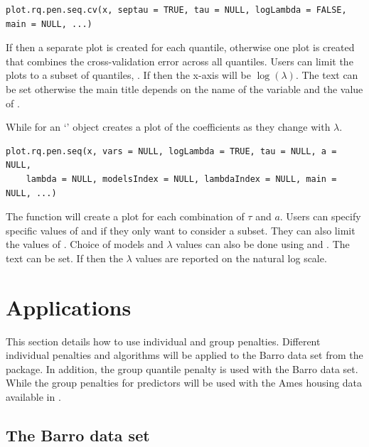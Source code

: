 \begin{verbatim}
plot.rq.pen.seq.cv(x, septau = TRUE, tau = NULL, logLambda = FALSE, main = NULL, ...)
\end{verbatim}

If  then a separate plot is created for each quantile, otherwise one plot is created that combines the cross-validation error across all quantiles. Users can limit the plots to a subset of quantiles, . If  then the x-axis will be \(\log(\lambda)\). The  text can be set otherwise the main title depends on the name of the variable and the value of .

While  for an `' object creates a plot of the coefficients as they change with \(\lambda\).

\begin{verbatim}
plot.rq.pen.seq(x, vars = NULL, logLambda = TRUE, tau = NULL, a = NULL,
    lambda = NULL, modelsIndex = NULL, lambdaIndex = NULL, main = NULL, ...)
\end{verbatim}

The  function will create a plot for each combination of \(\tau\) and \(a\). Users can specify specific values of  and  if they only want to consider a subset. They can also limit the values of . Choice of models and \(\lambda\) values can also be done using  and . The  text can be set. If  then the \(\lambda\) values are reported on the natural log scale.

\section{Applications}\label{applications}

This section details how to use individual and group penalties. Different individual penalties and algorithms will be applied to the Barro data set from the  package. In addition, the group quantile penalty is used with the Barro data set. While the group penalties for predictors will be used with the Ames housing data \citep{de2011ames} available in .

\subsection{The Barro data set}\label{the-barro-data-set}

